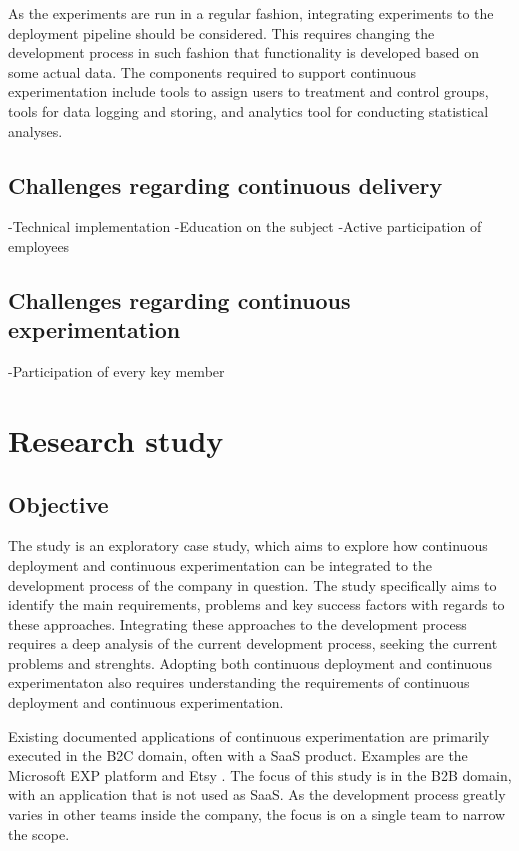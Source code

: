\documentclass[english]{tktltiki2}
\theoremstyle{definition}
\theoremstyle{remark}
\begin{document}
As the experiments are run in a regular fashion, integrating experiments to the deployment pipeline should be considered. This requires changing the development process in such fashion that functionality is developed based on some actual data. The components required to support continuous experimentation include tools to assign users to treatment and control groups, tools for data logging and storing, and analytics tool for conducting statistical analyses.

\subsection{Challenges regarding continuous delivery}
-Technical implementation
-Education on the subject
-Active participation of employees

\subsection{Challenges regarding continuous experimentation}
-Participation of every key member

\section{Research study}

\subsection{Objective} %

The study is an exploratory case study, which aims to explore how continuous deployment and continuous experimentation can be integrated to the development process of the company in question. The study specifically aims to identify the main requirements, problems and key success factors with regards to these approaches. Integrating these approaches to the development process requires a deep analysis of the current development process, seeking the current problems and strenghts. Adopting both continuous deployment and continuous experimentaton also requires understanding the requirements of continuous deployment and continuous experimentation. 

Existing documented applications of continuous experimentation are primarily executed in the B2C domain, often with a SaaS product. Examples are the Microsoft EXP platform \cite{ep} and Etsy \cite{}. The focus of this study is in the B2B domain, with an application that is not used as SaaS. As the development process greatly varies in other teams inside the company, the focus is on a single team to narrow the scope.
\end{document}
